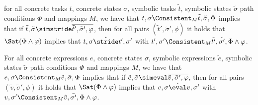 \begin{lemma}
  \label{lem:soundstride}
  for all concrete tasks $t$, concrete states $\sigma$, symbolic tasks $\tilde{t}$, symbolic states $\tilde{\sigma}$ path conditions $\Phi$ and mappings $M$,
  we have that $t,\sigma\Consistent_{M}\tilde{t},\tilde{\sigma},\Phi$ implies
  that if $\tilde{t},\tilde{\sigma}\simstride\overline{\tilde{t}',\tilde{\sigma}',\phi}$,
  then for all pairs $(\tilde{t}',\tilde{\sigma}',\phi)$ it holds that $\Sat(\Phi\land\phi)$ implies
  that $t,\sigma\hat{\stride}t',\sigma'$ with $t',\sigma'\Consistent_{M}\tilde{t'},\tilde{\sigma'},\Phi\land\phi$.
\end{lemma}

\begin{lemma}
  \label{lem:soundeval}
  For all concrete expressions $e$, concrete states $\sigma$, symbolic expressions $\tilde{e}$, symbolic states $\tilde{\sigma}$ path conditions $\Phi$ and mappings $M$,
  we have that $e,\sigma\Consistent_{M}\tilde{e},\tilde{\sigma},\Phi$ implies
  that if $\tilde{e},\tilde{\sigma}\simeval\overline{\tilde{v},\tilde{\sigma}',\phi}$,
  then for all pairs $(\tilde{v},\tilde{\sigma}',\phi)$ it holds that $\Sat(\Phi\land\phi)$ implies
  that $e,\sigma\hat{\eval}v,\sigma'$ with $v,\sigma'\Consistent_{M}\tilde{v},\tilde{\sigma'},\Phi\land\phi$.
\end{lemma}


